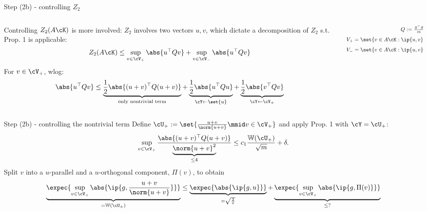 \documentclass[10pt]{beamer}
\begin{document}
\begin{frame}{Step (2b) - controlling $Z_2$}
\begin{columns}
    \begin{column}{0.75 \textwidth}
    Controlling $Z_2(A \cK)$ is more involved: $Z_2$ involves two vectors $u,
    v$, which dictate a decomposition of $Z_2$ s.t. Prop. 1 is applicable:
    \[
        Z_2(A \cK) \leq \sup_{v \in \cV_+} \abs{u^\top Q v} +
        \sup_{v \in \cV_-} \abs{u^\top Q v}
    \]
    For $v \in \cV_+$, wlog:
    \[
        \abs{u^\top Q v} \leq
        \underbrace{\frac{1}{2} \abs{(u + v)^\top Q (u + v)}}_{
            \text{only nontrivial term}}
        + \underbrace{\frac{1}{2} \abs{u^\top Q u}}_{\cY \gets \set{u}} +
        \underbrace{\frac{1}{2} \abs{v^\top Q v}}_{\cY \gets \cV_+}
    \]
    \end{column}
    \vrule{}
    \begin{column}{0.24 \textwidth}
        \begin{align*}
            \scalebox{0.8}{$Q := \frac{S^\top S}{m} - I_n$} \\
            \scalebox{0.8}{$V_+ = \set{v \in A \cK : \ip{u, v} \geq 0}$} \\
            \scalebox{0.8}{$V_- = \set{v \in A \cK : \ip{u, v} < 0}$}
        \end{align*}
    \end{column}
\end{columns}
\end{frame}

\begin{frame}{Step (2b) - controlling the nontrivial term}
    Define $\cU_+ := \set{\frac{u + v}{\norm{u + v}} \mmid v \in \cV_+}$ and
    apply Prop. 1 with $\cY = \cU_+$:
    \[
        \sup_{v \in \cV_+}
        \frac{\abs{(u + v)^\top Q (u + v)}}{
        \underbrace{\norm{u + v}^2}_{\leq 4}}
        \leq c_1 \frac{\mathbb{W}(\cU_+)}{\sqrt{m}} + \delta.
    \]
    Split $v$ into a $u$-parallel and a $u$-orthogonal component, $\Pi(v)$, to
    obtain
    \[
        \underbrace{\expec{\sup_{v \in \cV_+} \abs{\ip{g, \frac{u+v}{\norm{u +
        v}}}}}}_{= \mathbb{W}(\cU_+)}
        \leq \underbrace{\expec{\abs{\ip{g, u}}}}_{= \sqrt{\frac{2}{\pi}}} +
        \underbrace{\expec{\sup_{v \in \cV_+} \abs{\ip{g, \Pi(v)}}}}_{
        \leq ?}
    \]
\end{frame}
\end{document}
